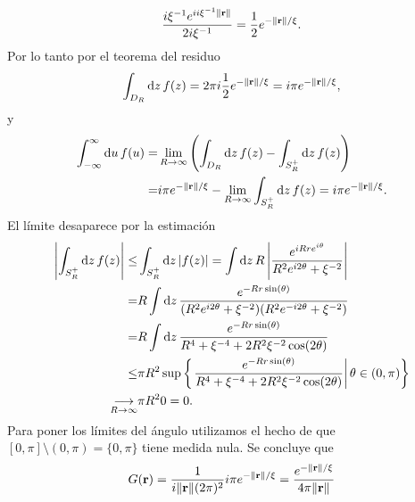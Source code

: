 \documentclass{article}
\begin{document}
\begin{enumerate}
\begin{equation}
\frac{i\xi^{-1}e^{ii\xi^{-1}\|\vb{r}\|}}{2i\xi^{-1}}=\frac{1}{2}e^{-\|\vb{r}\|/\xi}.
\end{equation}
Por lo tanto por el teorema del residuo
\begin{equation}
\int_{D_R}\dd{z}f(z)=2\pi i\frac{1}{2}e^{-\|\vb{r}\|/\xi}=i\pi e^{-\|\vb{r}\|/\xi},
\end{equation}
y
\begin{align}
\begin{split}
\int_{-\infty}^\infty \dd{u}f(u)=&\lim_{R\rightarrow\infty}\qty(\int_{D_R}\dd{z}f(z)-\int_{S^+_R}\dd{z}f(z))\\
=&i\pi e^{-\|\vb{r}\|/\xi}-\lim_{R\rightarrow\infty}\int_{S^+_R}\dd{z}f(z)=i\pi e^{-\|\vb{r}\|/\xi}.
\end{split}
\end{align}
El límite desaparece por la estimación
\begin{align}
\begin{split}
\left\vert\int_{S^+_R}\dd{z}f(z)\right\vert\leq&\int_{S^+_R}\dd{z}|f(z)|=\int\dd{z}R\left\vert \frac{e^{iRre^{i\theta}}}{R^2e^{i2\theta}+\xi^{-2}}\right\vert\\
=&R\int\dd{z}\frac{e^{-Rr\sin(\theta)}}{(R^2e^{i2\theta}+\xi^{-2})(R^2e^{-i2\theta}+\xi^{-2})}\\
=&R\int\dd{z}\frac{e^{-Rr\sin(\theta)}}{R^4+\xi^{-4}+2R^2\xi^{-2}\cos(2\theta)}\\
\leq&\pi R^2\sup\qty{\left.\frac{e^{-Rr\sin(\theta)}}{R^4+\xi^{-4}+2R^2\xi^{-2}\cos(2\theta)}\right\vert\theta\in\qty(0,\pi)}\\
\underset{R\rightarrow\infty}{\longrightarrow}&\pi R^2 0=0.
\end{split}
\end{align}
Para poner los límites del ángulo utilizamos el hecho de que $[0,\pi]\setminus(0,\pi)=\{0,\pi\}$ tiene medida nula. Se concluye que
\begin{equation}
G(\vb{r})=\frac{1}{i\|\vb{r}\|(2\pi)^2}i\pi e^{-\|\vb{r}\|/\xi}=\frac{e^{-\|\vb{r}\|/\xi}}{4\pi\|\vb{r}\|}
\end{equation}


\end{enumerate}
\end{document}
